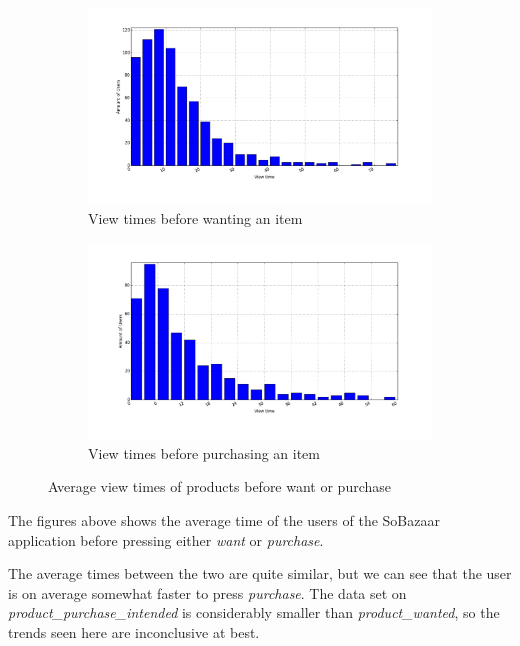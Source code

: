 \begin{figure}[H]
  \centering
  \begin{subfigure}{.5\textwidth}
      \centering
      \includegraphics[width=\dualGraphWidth]{image/product_wanteddistribution.png}
      \caption{View times before wanting an item}
      \label{figure:viewWant}
  \end{subfigure}%
  \begin{subfigure}{.5\textwidth}
      \centering
      \includegraphics[width=\dualGraphWidth]{image/product_purchase_intendeddistribution.png}
      \caption{View times before purchasing an item}
      \label{figure:viewBuy}
  \end{subfigure}
  \caption{Average view times of products before want or purchase}
\end{figure}

The figures above shows the average time of the users of the SoBazaar
application before pressing either \emph{want} or \emph{purchase}.

The average times between the two are quite similar, but we can see that the
user is on average somewhat faster to press \emph{purchase}.  The data set on
\emph{product\_purchase\_intended} is considerably smaller than
\emph{product\_wanted}, so the trends seen here are inconclusive at best.

